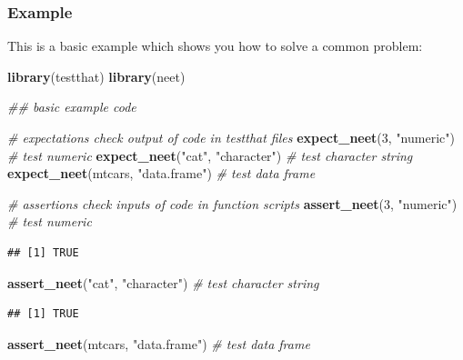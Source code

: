 \documentclass[
]{article}
\newenvironment{Shaded}{\begin{snugshade}}{\end{snugshade}}
\newcommand{\CommentTok}[1]{\textcolor[rgb]{0.56,0.35,0.01}{\textit{#1}}}
\newcommand{\DecValTok}[1]{\textcolor[rgb]{0.00,0.00,0.81}{#1}}
\newcommand{\KeywordTok}[1]{\textcolor[rgb]{0.13,0.29,0.53}{\textbf{#1}}}
\newcommand{\NormalTok}[1]{#1}
\newcommand{\StringTok}[1]{\textcolor[rgb]{0.31,0.60,0.02}{#1}}
\begin{document}
\hypertarget{example}{%
\subsubsection{Example}\label{example}}

This is a basic example which shows you how to solve a common problem:

\begin{Shaded}
\begin{Highlighting}[]
\KeywordTok{library}\NormalTok{(testthat)}
\KeywordTok{library}\NormalTok{(neet)}

\CommentTok{\#\# basic example code}

\CommentTok{\# expectations check output of code in testthat files}
\KeywordTok{expect\_neet}\NormalTok{(}\DecValTok{3}\NormalTok{, }\StringTok{"numeric"}\NormalTok{) }\CommentTok{\# test numeric}
\KeywordTok{expect\_neet}\NormalTok{(}\StringTok{"cat"}\NormalTok{, }\StringTok{"character"}\NormalTok{) }\CommentTok{\# test character string}
\KeywordTok{expect\_neet}\NormalTok{(mtcars, }\StringTok{"data.frame"}\NormalTok{) }\CommentTok{\# test data frame}

\CommentTok{\# assertions check inputs of code in function scripts}
\KeywordTok{assert\_neet}\NormalTok{(}\DecValTok{3}\NormalTok{, }\StringTok{"numeric"}\NormalTok{) }\CommentTok{\# test numeric}
\end{Highlighting}
\end{Shaded}

\begin{verbatim}
## [1] TRUE
\end{verbatim}

\begin{Shaded}
\begin{Highlighting}[]
\KeywordTok{assert\_neet}\NormalTok{(}\StringTok{"cat"}\NormalTok{, }\StringTok{"character"}\NormalTok{) }\CommentTok{\# test character string}
\end{Highlighting}
\end{Shaded}

\begin{verbatim}
## [1] TRUE
\end{verbatim}

\begin{Shaded}
\begin{Highlighting}[]
\KeywordTok{assert\_neet}\NormalTok{(mtcars, }\StringTok{"data.frame"}\NormalTok{) }\CommentTok{\# test data frame}
\end{Highlighting}
\end{Shaded}
\end{document}
